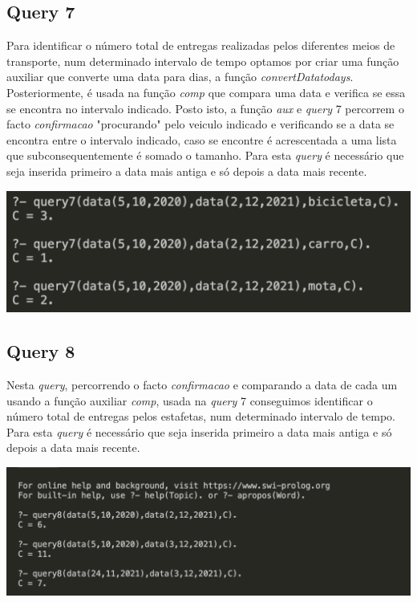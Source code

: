 \documentclass[a4paper,12pt]{article}
\begin{document}
    \newpage
    \subsection{Query 7}
        Para identificar o número total de entregas realizadas pelos diferentes meios de transporte, num determinado intervalo de tempo optamos por criar uma função auxiliar que converte uma data para dias, a função \emph{convertDatatodays}. Posteriormente, é usada na função \emph{comp} que compara uma data e verifica se essa se encontra no intervalo indicado. Posto isto, a função \emph{aux} e \emph{query} 7 percorrem o facto \emph{confirmacao} "procurando" pelo veiculo indicado e verificando se a data se encontra entre o intervalo indicado, caso se encontre é acrescentada a uma lista que subconsequentemente é somado o tamanho. Para esta \emph{query} é necessário que seja inserida primeiro a data mais antiga e só depois a data mais recente.\par
    
        \begin{center}
            \includegraphics[scale=0.5]{imagens/query7.png}
        \end{center}

    \subsection{Query 8}
        Nesta \emph{query}, percorrendo o facto \emph{confirmacao} e comparando a data de cada um usando a função auxiliar \emph{comp}, usada na \emph{query} 7 conseguimos identificar o número total de entregas pelos estafetas, num determinado intervalo de tempo. Para esta \emph{query} é necessário que seja inserida primeiro a data mais antiga e só depois a data mais recente.\par
        
        \begin{center}
            \includegraphics[scale=0.6]{imagens/query8.png}
        \end{center}
\end{document}
